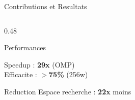 \documentclass[aspectratio=169,9pt]{beamer}
\begin{document}
\begin{frame}{Contributions et Resultats}
\begin{columns}[T]
\begin{column}{0.48\textwidth}
\begin{exampleblock}{Performances}
\begin{itemize}
                \end{itemize}
                \vspace{0.1cm}
                Speedup : \textbf{29x} (OMP)\\
                Efficacite : \textbf{$>$75\%} (256w)
            \end{exampleblock}
            \begin{block}{Reduction}
                \small
                Espace recherche : \textbf{22x} moins
            \end{block}
        \end{column}
    \end{columns}
\end{frame}

\end{document}
